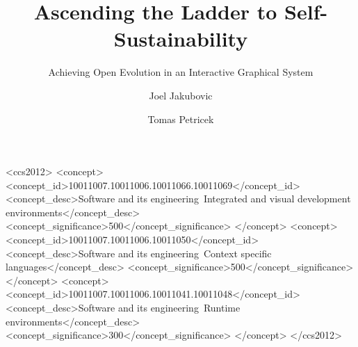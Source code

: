 \documentclass[sigplan,screen]{acmart}
\title{Ascending the Ladder to Self-Sustainability}
\subtitle{Achieving Open Evolution in an Interactive Graphical System}
\author{Joel Jakubovic}
\affiliation{\institution{University of Kent} \city{Canterbury} \country{United Kingdom}}
\author{Tomas Petricek}
\affiliation{\institution{Charles University} \city{Prague} \country{Czechia}}
\begin{document}
\begin{CCSXML}
<ccs2012>
   <concept>
       <concept_id>10011007.10011006.10011066.10011069</concept_id>
       <concept_desc>Software and its engineering~Integrated and visual development environments</concept_desc>
       <concept_significance>500</concept_significance>
       </concept>
   <concept>
       <concept_id>10011007.10011006.10011050</concept_id>
       <concept_desc>Software and its engineering~Context specific languages</concept_desc>
       <concept_significance>500</concept_significance>
       </concept>
   <concept>
       <concept_id>10011007.10011006.10011041.10011048</concept_id>
       <concept_desc>Software and its engineering~Runtime environments</concept_desc>
       <concept_significance>300</concept_significance>
       </concept>
</ccs2012>
\end{CCSXML}



\lstset{breaklines=true, columns=fullflexible, breakatwhitespace=true, basicstyle=\ttfamily\footnotesize}

\newcommand{\joel}[1]{}
\newcommand{\tomas}[1]{}
\newcommand{\note}[1]{}
\newcommand{\notes}[1]{}
\newcommand{\todo}[1]{\textbf{TODO: #1}}
\newcommand{\delete}[1]{\textbf{DELETE:}#1}
\providecommand{\tightlist}{}%
\newenvironment{longtable}[2]{\begin{tabular}}{\end{tabular}}
\newenvironment{head}{}{}
\theoremstyle{definition}
\newtheorem{force}{Force}
\newtheorem{heuristic}{Heuristic}
\newtheorem{requirement}{Requirement}
\newcommand{\naive}{na\"ive}



\appendix




\end{document}
